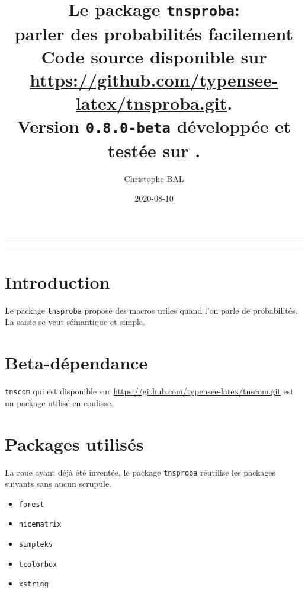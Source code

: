\documentclass[12pt,a4paper]{article}
\theoremstyle{definition}
\begin{document}
\renewcommand\labelitemi{\raisebox{0.125em}{\tiny\textbullet}}
\renewcommand{\labelitemii}{---}

\title{  %
	Le package \texttt{tnsproba}:\\%
	parler des probabilités facilement\\%
	{\footnotesize Code source disponible sur \url{https://github.com/typensee-latex/tnsproba.git}.}\\%
{\footnotesize Version \texttt{0.8.0-beta} développée et testée sur \macosxname{}.}%
}
\author{Christophe BAL}
\date{2020-08-10}

\maketitle


\vspace{2em}

\hrule

\tableofcontents

\vspace{1.5em}

\hrule

\newpage

\section{Introduction}

Le package \verb+tnsproba+ propose des macros utiles quand l'on parle de probabilités. La saisie se veut sémantique et simple.


\section{Beta-dépendance}

\verb#tnscom# qui est disponible sur \url{https://github.com/typensee-latex/tnscom.git} est un package utilisé en coulisse.
\section{Packages utilisés}

La roue ayant déjà été inventée, le package \verb#tnsproba# réutilise les packages suivants sans aucun scrupule.

\begin{multicols}{4}
    \begin{itemize}
        \item \verb#forest#
        \item \verb#nicematrix#
        \item \verb#simplekv#
        \item \verb#tcolorbox#
        \item \verb#xstring#
    \end{itemize}
\end{multicols}
\end{document}
